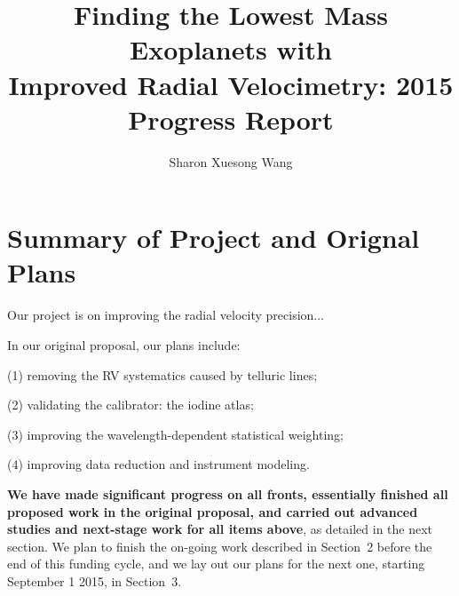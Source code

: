 \documentclass[12pt]{article}
\begin{document}

\title{\vspace{-45pt} \bf \Large Finding the Lowest Mass Exoplanets with
  \\ Improved Radial Velocimetry: 2015 Progress Report \vspace{-15pt}}
\author{\normalsize Sharon Xuesong Wang}
\date{}
\maketitle

\vspace{-40pt}
\section{Summary of Project and Orignal Plans}
\vspace{-5pt}

Our project is on improving the radial velocity precision...

In our original proposal, our plans include:

(1) removing the RV systematics caused by telluric lines;

(2) validating the calibrator: the iodine atlas;

(3) improving the wavelength-dependent statistical weighting;

(4) improving data reduction and instrument modeling.

{\bf We have made significant progress on all fronts, essentially
  finished all proposed work in the original proposal, and carried out
  advanced studies and next-stage work for all items above}, as
detailed in the next section. We plan to finish the on-going work
described in Section~2 before the end of this funding cycle, and we
lay out our plans for the next one, starting September 1 2015, in
Section~3.
\end{document}
